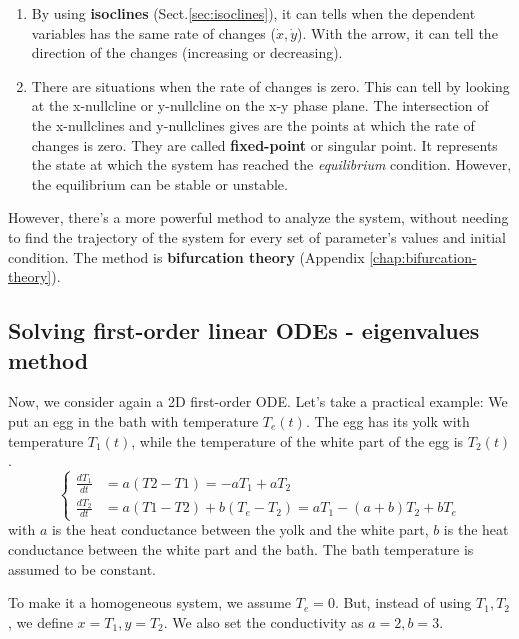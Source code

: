 \begin{enumerate}
  \item By using {\bf isoclines} (Sect.\ref{sec:isoclines}), it can tells when the
dependent variables has the same rate of changes ($\dot{x},\dot{y}$). With the
arrow, it can tell the direction of the changes (increasing or decreasing).
  
  \item There are situations when the rate of changes is zero. This can tell by
  looking at the x-nullcline or y-nullcline on the x-y phase plane. The
  intersection of the x-nullclines and y-nullclines gives are the points at
  which the rate of changes is zero. They are called {\bf fixed-point} or
  singular point.
  It represents the state at which the system has reached the {\it equilibrium}
  condition. However, the equilibrium can be stable or unstable.
   
\end{enumerate}
However, there's a more powerful method to analyze the system, without needing
to find the trajectory of the system for every set of parameter's values and
initial condition. The method is {\bf bifurcation theory} (Appendix
\ref{chap:bifurcation-theory}).

\subsection{Solving first-order linear ODEs - eigenvalues method}
\label{sec:eigenvalues-method}
\label{sec:characteristic-function}

Now, we consider again a 2D first-order ODE. Let's take a practical
example: We put an egg in the bath with temperature $T_e(t)$. The egg
has its yolk with temperature $T_1(t)$, while the temperature of the
white part of the egg is $T_2(t)$. 
\begin{equation}
  \label{eq:594}
  \left\{
    \begin{array}{ll}
      \frac{dT_1}{dt} &= a(T2-T1) = -aT_1 + aT_2\\
      \frac{dT_2}{dt} &= a(T1-T2) + b(T_e-T_2) = aT_1 - (a+b)T_2 + bT_e
    \end{array}
  \right.
\end{equation}
with $a$ is the heat conductance between the yolk and the white part,
$b$ is the heat conductance between the white part and the bath. The
bath temperature is assumed to be constant. 

To make it a homogeneous system, we assume $T_e=0$. But, instead of
using $T_1,T_2$, we define $x=T_1, y=T_2$. We also set the
conductivity as $a=2, b=3$. 

